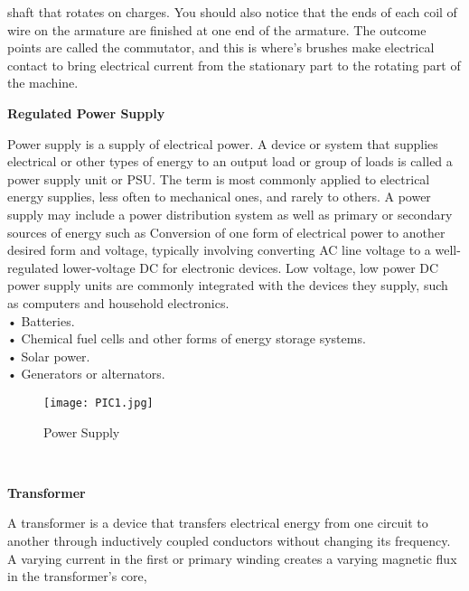 \documentclass[a4paper,12pt, English]{article}
\begin{document}
\begin{normalsize}
shaft that rotates on charges. You should also notice that the ends of each coil of wire on the
armature are finished at one end of the armature. The outcome points are called the
commutator, and this is where's brushes make electrical contact to bring electrical current from
the stationary part to the rotating part of the machine.
\newline
\newline
\begin{large}
\textbf{Regulated Power Supply}
\end{large}
\newline
Power supply is a supply of electrical power. A device or system that supplies
electrical or other types of energy to an output load or group of loads is called a power supply unit
or PSU. The term is most commonly applied to electrical energy supplies, less often to
mechanical ones, and rarely to others.
A power supply may include a power distribution system as well as primary or
secondary sources of energy such as
Conversion of one form of electrical power to another desired form and voltage, typically
involving converting AC line voltage to a well-regulated lower-voltage DC for electronic
devices. Low voltage, low power DC power supply units are commonly integrated with the
devices they supply, such as computers and household electronics.
\\
• Batteries.\\
• Chemical fuel cells and other forms of energy storage systems.\\
• Solar power.\\
• Generators or alternators.\\
\begin{figure}[htb]
\begin{center}
\texttt{[image: PIC1.jpg]}
\end{center}
\begin{center}
\renewcommand{\thefigure}{3. 2. 6}
\caption{\footnotesize Power Supply}
\end{center}
\end{figure}\\
\begin{large}
\textbf{Transformer}
\end{large}
\newline
A transformer is a device that transfers electrical energy from one circuit to
another through inductively coupled conductors without changing its frequency. A varying
current in the first or primary winding creates a varying magnetic flux in the transformer's core,

\end{normalsize}
\end{document}
